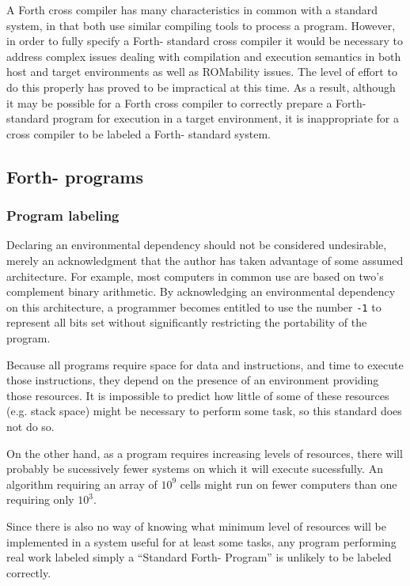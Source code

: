 A Forth cross compiler has many characteristics in common with a standard
system, in that both use similar compiling tools to process a program.
However, in order to fully specify a Forth-\snapshot{} standard
cross compiler it would be necessary to address complex issues dealing with
compilation
and execution semantics in both host and target environments as well as
ROMability issues. The level of effort to do this properly has proved to
be impractical at this time. As a result, although it may be possible
for a Forth cross compiler to correctly prepare a Forth-\snapshot{}
standard program for execution in a target environment, it is inappropriate
for a cross compiler to be labeled a Forth-\snapshot{} standard system.

\subsection{Forth-\snapshot{} programs} %

\setcounter{subsubsection}{1}
\subsubsection{Program labeling} %

Declaring an environmental dependency should not be considered
undesirable, merely an acknowledgment that the author has taken
advantage of some assumed architecture. For example, most computers
in common use are based on two's complement binary arithmetic. By
acknowledging an environmental dependency on this architecture,
a programmer becomes entitled to use the number \texttt{-1} to
represent all bits set without significantly restricting the
portability of the program.

Because all programs require space for data and instructions, and
time to execute those instructions, they depend on the presence of
an environment providing those resources. It is impossible to predict
how little of some of these resources (e.g. stack space) might be
necessary to perform some task, so this standard does not do so.

On the other hand, as a program requires increasing levels of
resources, there will probably be sucessively fewer systems on
which it will execute sucessfully. An algorithm requiring an array
of $10^9$ cells might run on fewer computers than one requiring
only $10^3$.

Since there is also no way of knowing what minimum level of resources
will be implemented in a system useful for at least some tasks, any
program performing real work labeled simply
a ``Standard Forth-\snapshot{} Program'' is unlikely to be labeled
correctly.


